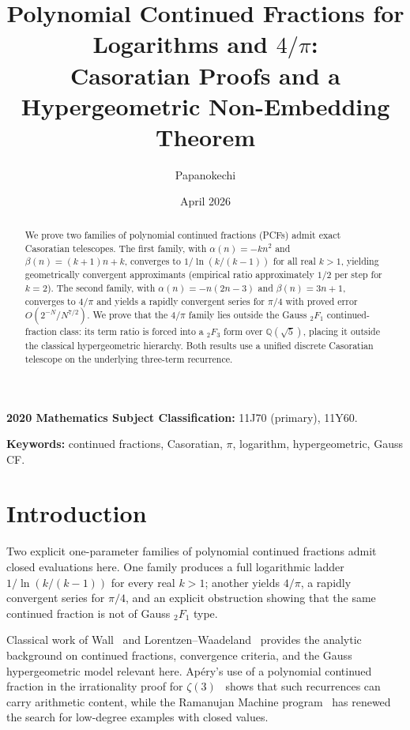 \documentclass[11pt,a4paper]{article}
\title{Polynomial Continued Fractions for Logarithms and
\texorpdfstring{$4/\pi$}{4/pi}:\\
Casoratian Proofs and a Hypergeometric Non-Embedding Theorem}
\author{Papanokechi}
\date{April 2026}
\theoremstyle{plain}
\theoremstyle{definition}
\theoremstyle{remark}
\begin{document}
\maketitle

\begin{abstract}
We prove two families of polynomial continued fractions (PCFs) admit
exact Casoratian telescopes. The first family, with
$\alpha(n) = -kn^2$ and $\beta(n) = (k{+}1)n + k$, converges to
$1/\ln(k/(k{-}1))$ for all real $k>1$, yielding geometrically
convergent approximants (empirical ratio approximately $1/2$ per
step for $k=2$).
The second family, with $\alpha(n) = -n(2n{-}3)$ and
$\beta(n) = 3n+1$, converges to $4/\pi$ and yields a rapidly
convergent series for $\pi/4$ with proved error $O(2^{-N}/N^{7/2})$. We prove that the $4/\pi$ family
lies outside the Gauss ${}_2F_1$ continued-fraction class:
its term ratio is forced into a ${}_2F_3$ form over
$\mathbb{Q}(\sqrt{5})$, placing it outside the classical
hypergeometric hierarchy. Both results use a unified discrete
Casoratian telescope on the underlying three-term recurrence.
\end{abstract}

\noindent
\textbf{2020 Mathematics Subject Classification:}
11J70 (primary), 11Y60.

\noindent
\textbf{Keywords:}
continued fractions, Casoratian, $\pi$, logarithm,
hypergeometric, Gauss CF.

\tableofcontents

\section{Introduction}\label{sec:intro}

Two explicit one-parameter families of polynomial continued fractions admit
closed evaluations here. One family produces a full logarithmic ladder
$1/\ln(k/(k{-}1))$ for every real $k>1$; another yields $4/\pi$, a rapidly
convergent series for $\pi/4$, and an explicit obstruction showing that the
same continued fraction is not of Gauss ${}_2F_1$ type.

Classical work of Wall~\cite{wall1948} and Lorentzen--Waadeland~\cite{lorentzen2008}
provides the analytic background on continued fractions, convergence criteria,
and the Gauss hypergeometric model relevant here. Ap\'ery's use of a polynomial
continued fraction in the irrationality proof for $\zeta(3)$~\cite{apery1979}
shows that such recurrences can carry arithmetic content, while the Ramanujan
Machine program~\cite{raayoni2021,elimelech2024} has renewed the search for
low-degree examples with closed values.
\end{document}
